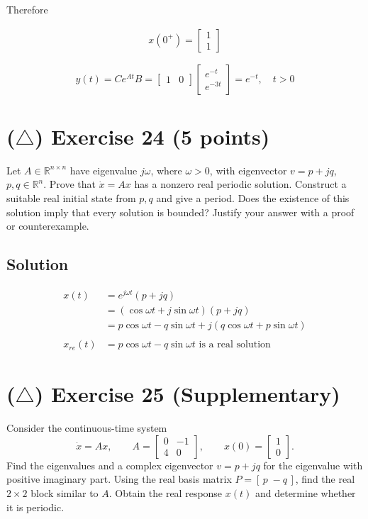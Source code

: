 \documentclass[12pt,a4paper]{article}
\begin{document}
Therefore

\begin{align*}
	x(0^+) = \begin{bmatrix}
		1 \\1
	\end{bmatrix}
\end{align*}


\[
y(t) = Ce^{At}B = \begin{bmatrix}
	1 & 0 
\end{bmatrix}\begin{bmatrix}
e^{-t} \\ e^{-3t}
\end{bmatrix} = e^{-t}, \quad t > 0
\]

\vspace{3cm}
\vfill
\section*{($\triangle$) Exercise 24 \hfill {\normalsize (5 points)}}
Let $A\in\mathbb R^{n\times n}$ have eigenvalue $j\omega$, where $\omega>0$, with eigenvector $v=p+jq$, $p,q\in\mathbb R^n$.
Prove that $\dot x=Ax$ has a nonzero real periodic solution. Construct a suitable real initial state from $p,q$ and give a period. Does the existence of this solution imply that every solution is bounded? Justify your answer with a proof or counterexample.
\subsection*{Solution}

\begin{align*}
x(t) &= e^{j\omega t} (p + jq) \\
&= (\cos \omega t + j\sin \omega t) (p + jq) \\
&= p\cos \omega t - q\sin \omega t + j( q\cos \omega t + p\sin \omega t ) \\ \\
x_{re}(t) &= p\cos \omega t - q\sin \omega t \text{ is a real solution}
\end{align*}

\vspace{3cm}
\clearpage
\section*{($\triangle$) Exercise 25 \hfill {\normalsize (Supplementary)}}
Consider the continuous-time system
\[
\dot x=Ax,\qquad
A=\begin{bmatrix}0&-1\\4&0\end{bmatrix},\qquad
x(0)=\begin{bmatrix}1\\0\end{bmatrix}.
\]
Find the eigenvalues and a complex eigenvector $v=p+jq$ for the eigenvalue
with positive imaginary part. Using the real basis matrix
$P=[\,p\; -q\,]$, find the real $2\times2$ block similar to $A$. Obtain
the real response $x(t)$ and determine whether it is periodic.
\end{document}
